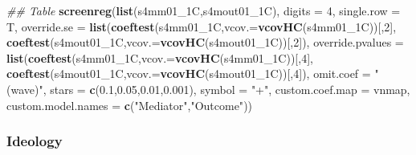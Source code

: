 \documentclass[
]{article}
\newenvironment{Shaded}{\begin{snugshade}}{\end{snugshade}}
\newcommand{\CommentTok}[1]{\textcolor[rgb]{0.56,0.35,0.01}{\textit{#1}}}
\newcommand{\DataTypeTok}[1]{\textcolor[rgb]{0.13,0.29,0.53}{#1}}
\newcommand{\DecValTok}[1]{\textcolor[rgb]{0.00,0.00,0.81}{#1}}
\newcommand{\FloatTok}[1]{\textcolor[rgb]{0.00,0.00,0.81}{#1}}
\newcommand{\KeywordTok}[1]{\textcolor[rgb]{0.13,0.29,0.53}{\textbf{#1}}}
\newcommand{\NormalTok}[1]{#1}
\newcommand{\StringTok}[1]{\textcolor[rgb]{0.31,0.60,0.02}{#1}}
\begin{document}
\begin{Shaded}
\begin{Highlighting}[]
\CommentTok{## Table}
\KeywordTok{screenreg}\NormalTok{(}\KeywordTok{list}\NormalTok{(s4mm01_1C,s4mout01_1C), }\DataTypeTok{digits =} \DecValTok{4}\NormalTok{, }\DataTypeTok{single.row =}\NormalTok{ T,}
          \DataTypeTok{override.se =} \KeywordTok{list}\NormalTok{(}\KeywordTok{coeftest}\NormalTok{(s4mm01_1C,}\DataTypeTok{vcov.=}\KeywordTok{vcovHC}\NormalTok{(s4mm01_1C))[,}\DecValTok{2}\NormalTok{],}
                             \KeywordTok{coeftest}\NormalTok{(s4mout01_1C,}\DataTypeTok{vcov.=}\KeywordTok{vcovHC}\NormalTok{(s4mout01_1C))[,}\DecValTok{2}\NormalTok{]),}
          \DataTypeTok{override.pvalues =} \KeywordTok{list}\NormalTok{(}\KeywordTok{coeftest}\NormalTok{(s4mm01_1C,}\DataTypeTok{vcov.=}\KeywordTok{vcovHC}\NormalTok{(s4mm01_1C))[,}\DecValTok{4}\NormalTok{],}
                                  \KeywordTok{coeftest}\NormalTok{(s4mout01_1C,}\DataTypeTok{vcov.=}\KeywordTok{vcovHC}\NormalTok{(s4mout01_1C))[,}\DecValTok{4}\NormalTok{]),}
          \DataTypeTok{omit.coef =} \StringTok{"(wave)"}\NormalTok{, }\DataTypeTok{stars =} \KeywordTok{c}\NormalTok{(}\FloatTok{0.1}\NormalTok{,}\FloatTok{0.05}\NormalTok{,}\FloatTok{0.01}\NormalTok{,}\FloatTok{0.001}\NormalTok{), }\DataTypeTok{symbol =} \StringTok{"+"}\NormalTok{,}
          \DataTypeTok{custom.coef.map =}\NormalTok{ vnmap, }
          \DataTypeTok{custom.model.names =} \KeywordTok{c}\NormalTok{(}\StringTok{"Mediator"}\NormalTok{,}\StringTok{"Outcome"}\NormalTok{))}
\end{Highlighting}
\end{Shaded}

\hypertarget{ideology}{%
\subsubsection{Ideology}\label{ideology}}
\end{document}
